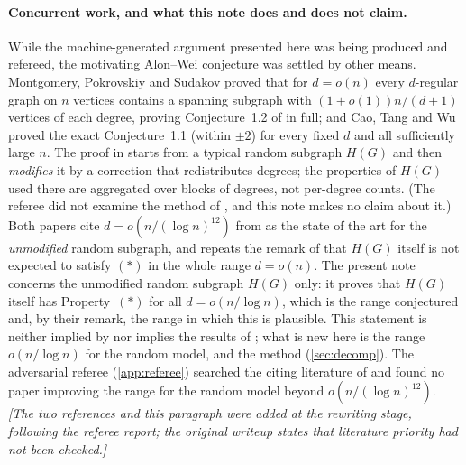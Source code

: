 \documentclass[11pt,a4paper]{article}
\theoremstyle{plain}
\theoremstyle{definition}
\theoremstyle{remark}
\begin{document}
\paragraph{Concurrent work, and what this note does and does not claim.}
While the machine-generated argument presented here was being produced and refereed, the motivating Alon--Wei conjecture was settled by other means. Montgomery, Pokrovskiy and Sudakov \cite{MPS26} proved that for $d=o(n)$ every $d$-regular graph on $n$ vertices contains a spanning subgraph with $(1+o(1))n/(d+1)$ vertices of each degree, proving Conjecture~1.2 of \cite{FLP24} in full; and Cao, Tang and Wu \cite{CTW26} proved the exact Conjecture~1.1 (within $\pm2$) for every fixed $d$ and all sufficiently large $n$. The proof in \cite{MPS26} starts from a typical random subgraph $H(G)$ and then \emph{modifies} it by a correction that redistributes degrees; the properties of $H(G)$ used there are aggregated over blocks of degrees, not per-degree counts. (The referee did not examine the method of \cite{CTW26}, and this note makes no claim about it.) Both papers cite $d=o(n/(\log n)^{12})$ from \cite{FLP24} as the state of the art for the \emph{unmodified} random subgraph, and \cite{MPS26} repeats the remark of \cite{FLP24} that $H(G)$ itself is not expected to satisfy $(\ast)$ in the whole range $d=o(n)$. The present note concerns the unmodified random subgraph $H(G)$ only: it proves that $H(G)$ itself has Property~$(\ast)$ for all $d=o(n/\log n)$, which is the range \cite{FLP24} conjectured and, by their remark, the range in which this is plausible. This statement is neither implied by nor implies the results of \cite{MPS26,CTW26}; what is new here is the range $o(n/\log n)$ for the random model, and the method (\cref{sec:decomp}). The adversarial referee (\cref{app:referee}) searched the citing literature of \cite{FLP24} and found no paper improving the range for the random model beyond $o(n/(\log n)^{12})$. \emph{[The two references \cite{MPS26,CTW26} and this paragraph were added at the rewriting stage, following the referee report; the original writeup states that literature priority had not been checked.]}
\end{document}
